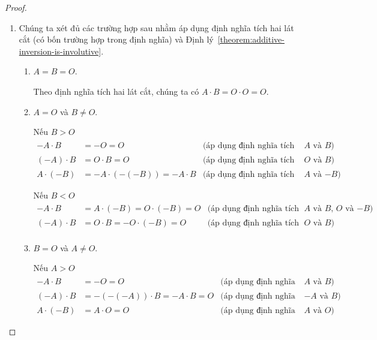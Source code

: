 \begin{proof}
    \begin{enumerate}[label={(\roman*)}]
        \item Chúng ta xét đủ các trường hợp sau nhằm áp dụng định nghĩa tích hai lát cắt (có bốn trường hợp trong định nghĩa) và Định lý~\ref{theorem:additive-inversion-is-involutive}.
              \begin{enumerate}[label={\textbf{Trường hợp \arabic*.}},itemindent=1cm]
                  \item $A = B = O$.

                        Theo định nghĩa tích hai lát cắt, chúng ta có $A\cdot B = O\cdot O = O$.
                  \item $A = O$ và $B\ne O$.

                        Nếu $B > O$
                        \begin{align*}
                            -A\cdot B   & = -O = O                      & \text{(áp dụng định nghĩa tích lát cắt cho $A$ và $B$)}  \\
                            (-A)\cdot B & = O\cdot B = O                & \text{(áp dụng định nghĩa tích lát cắt cho $O$ và $B$)}  \\
                            A\cdot (-B) & = -A\cdot (-(-B)) = -A\cdot B & \text{(áp dụng định nghĩa tích lát cắt cho $A$ và $-B$)}
                        \end{align*}

                        Nếu $B < O$
                        \begin{align*}
                            -A\cdot B   & = A\cdot (-B) = O\cdot (-B) = O & \text{(áp dụng định nghĩa tích lát cắt cho $A$ và $B$, $O$ và $-B$)} \\
                            (-A)\cdot B & = O\cdot B = -O\cdot (-B) = O   & \text{(áp dụng định nghĩa tích lát cắt cho $O$ và $B$)}              \\
                        \end{align*}
                  \item $B = O$ và $A\ne O$.

                        Nếu $A > O$
                        \begin{align*}
                            -A\cdot B   & = -O = O                          & \text{(áp dụng định nghĩa tích lát cắt cho $A$ và $B$)}  \\
                            (-A)\cdot B & = -(-(-A))\cdot B = -A\cdot B = O & \text{(áp dụng định nghĩa tích lát cắt cho $-A$ và $B$)} \\
                            A\cdot (-B) & = A\cdot O = O                    & \text{(áp dụng định nghĩa tích lát cắt cho $A$ và $O$)}
                        \end{align*}


\end{enumerate}
\end{enumerate}
\end{proof}
